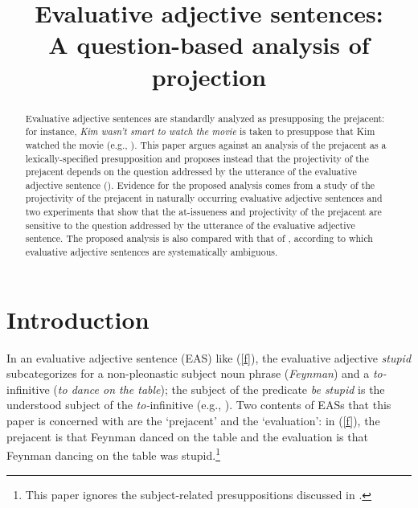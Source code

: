 \documentclass[11pt,fleqn]{article}
\title{Evaluative adjective sentences: \\ A question-based analysis of projection}
\author{}
\newcommand{\6}{\mbox{$[\hspace*{-.6mm}[$}}
\newcommand{\9}{\mbox{$]\hspace*{-.6mm}]$}}
\begin{document}

\maketitle


\begin{abstract}

Evaluative adjective sentences are standardly analyzed as presupposing the prejacent: for instance, {\em Kim wasn't smart to
watch the movie} is taken to presuppose that Kim watched the movie
(e.g., \citealt{norrick78,barker02,oshima09b,kertz2010}). This paper argues against an analysis of the prejacent as a lexically-specified presupposition and proposes instead that the projectivity of the prejacent depends on the question addressed by the utterance of the evaluative adjective sentence (\citealt{beaver-clark08,best-question,brst-ar}). Evidence for the proposed analysis comes from a study of the projectivity of the prejacent in naturally occurring evaluative adjective sentences and two experiments that show that the at-issueness and projectivity of the prejacent are sensitive to the question addressed by the utterance of the evaluative adjective sentence. The proposed analysis is also compared with that of \citealt{karttunen-etal2014}, according to which evaluative adjective sentences are systematically ambiguous. 


\end{abstract}


\section{Introduction}\label{s1}

In an evaluative adjective sentence (EAS) like (\ref{f}), the
evaluative adjective {\em stupid} subcategorizes for a non-pleonastic subject noun
phrase ({\em Feynman}) and a {\em to-}infinitive ({\em to
dance on the table}); the subject of the predicate {\em be stupid} is the understood subject of the {\em to-}infinitive (e.g., \citealt{wilkinson70, norrick78,barker02,kertz2010}). Two contents of EASs that this paper is concerned with are the `prejacent' and the `evaluation': in (\ref{f}), the prejacent is that Feynman danced on the table and the evaluation is that 
Feynman dancing on the table was stupid.\footnote{This paper ignores the subject-related presuppositions discussed in \citealt{barker02}.}
\end{document}
